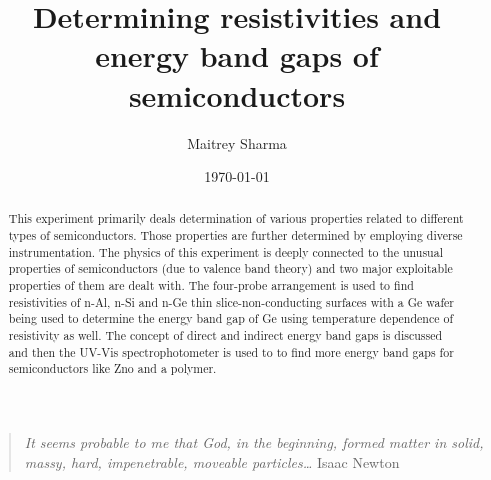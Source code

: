 \documentclass[%
 aip,
 amsmath,amssymb,
 reprint,%
]{revtex4-1}
\begin{document}

\title[Determining resistivities and energy band gaps of semiconductors]{Determining resistivities and energy band gaps of semiconductors}
\author{Maitrey Sharma}

\date{\today}%

\begin{abstract}
This experiment primarily deals determination of various properties related to different types of semiconductors. Those properties are further determined by employing diverse instrumentation. The physics of this experiment is deeply connected to the unusual properties of semiconductors (due to valence band theory) and two major exploitable properties of them are dealt with. The four-probe arrangement is used to find resistivities of n-Al, n-Si and n-Ge thin slice-non-conducting surfaces with a Ge wafer being used to determine the energy band gap of Ge using temperature dependence of resistivity as well. The concept of direct and indirect energy band gaps is discussed and then the UV-Vis spectrophotometer is used to to find more energy band gaps for semiconductors like Zno and a polymer.
\end{abstract}

\maketitle 


\begin{quotation}
\textit{It seems probable to me that God, in the beginning, formed matter in solid, massy, hard, impenetrable, moveable particles…}
\newline
\hspace*{0pt}\hfill Isaac Newton
\end{quotation}
\end{document}
